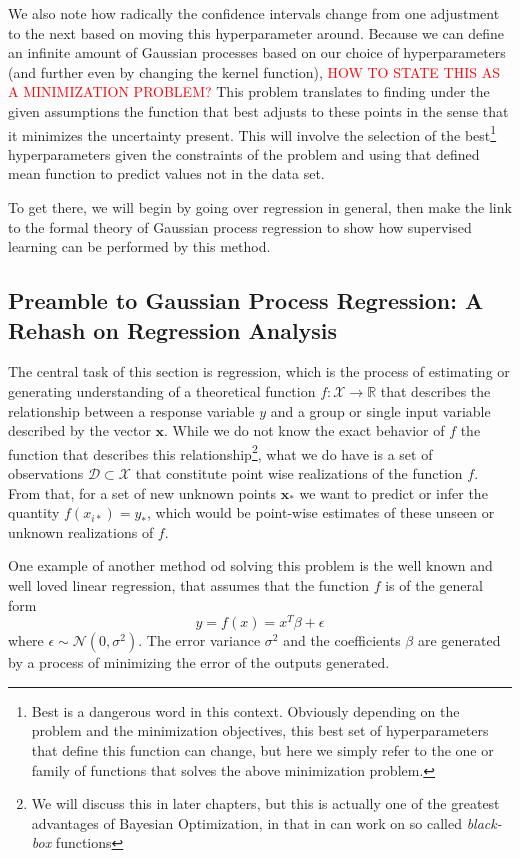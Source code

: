 We also note how radically the confidence intervals change from one adjustment to the next based on moving this hyperparameter around. Because we can define an infinite amount of Gaussian processes based on our choice of hyperparameters (and further even by changing the kernel function), \textcolor{red}{HOW TO STATE THIS AS A MINIMIZATION PROBLEM?}
This problem translates to finding under the given assumptions the function that best adjusts to these points in the sense that it minimizes the uncertainty present. This will involve the selection of the best\footnote{Best is a dangerous word in this context. Obviously depending on the problem and the minimization objectives, this best set of hyperparameters that define this function can change, but here we simply refer to the one or family of functions that solves the above minimization problem.} hyperparameters given the constraints of the problem and using that defined mean function to predict values not in the data set.

To get there, we will begin by going over regression in general, then make the link to the formal theory of Gaussian process regression to show how supervised learning can be performed by this method. 

\subsection{Preamble to Gaussian Process Regression: A Rehash on Regression Analysis}

The central task of this section is regression, which is the process of estimating or generating understanding of a theoretical function $f: \mathcal{X} \rightarrow \mathbb{R}$ that describes the relationship between a response variable $y$ and a group or single input variable described by the vector $\boldsymbol{x}$. While we do not know the exact behavior of $f$ the function that describes this relationship\footnote{We will discuss this in later chapters, but this is actually one of the greatest advantages of Bayesian Optimization, in that in can work on so called \textit{black-box} functions}, what we do have is a set of observations $\mathcal{D} \subset \mathcal{X}$ that constitute point wise realizations of the function $f$. From that, for a set of new unknown points $\boldsymbol{x}_*$ we want to predict or infer the quantity $f(x_{i*}) = y_*$, which would be point-wise estimates of these unseen or unknown realizations of $f$. 

One example of another method od solving this problem is the well known and well loved linear regression, that assumes that the function $f$ is of the general form 
\[ y = f(x) = x^T \beta + \epsilon \]
where $\epsilon \sim \mathcal{N}(0, \sigma^2)$. The error variance $\sigma^2$ and the coefficients $\beta$ are generated by a process of minimizing the error of the outputs generated. 
